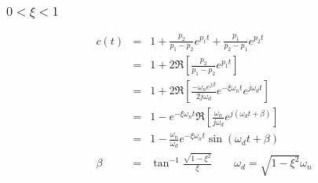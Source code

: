\documentclass{beamer}
\begin{document}
\begin{frame}
\frametitle{$0<\xi<1$}
\label{sec-2-6}

\begin{eqnarray*}
c(t) &=& 1+\frac{p_2}{p_1-p_2}e^{p_1 t}+\frac{p_1}{p_2-p_1}e^{p_2 t}\\
     &=& 1+2\Re\left[ \frac{p_2}{p_1-p_2}e^{p_1 t} \right]\\
     &=& 1+2\Re\left[ \frac{-\omega_n e^{j\beta}}{2j\omega_d}e^{-\xi\omega_n t}e^{j\omega_d t} \right]\\
     &=& 1-e^{-\xi\omega_n t}\Re\left[ \frac{\omega_n }{j\omega_d}e^{j(\omega_d t+\beta)} \right]\\
     &=& 1-\frac{\omega_n }{\omega_d}e^{-\xi\omega_n t}\sin(\omega_d t+\beta)\\
\beta & = & \tan^{-1}\frac{\sqrt{1-\xi^2}}{\xi} \qquad   \omega_d = \sqrt{1-\xi^2}\omega_n
\end{eqnarray*}
\end{frame}
\end{document}

